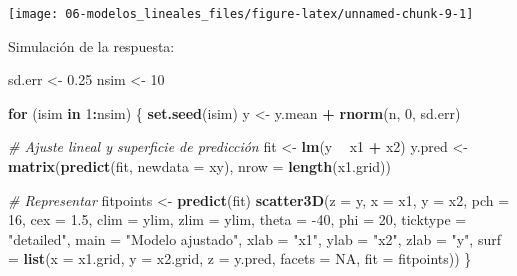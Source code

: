 \documentclass[
  spanish,
]{book}
\newenvironment{Shaded}{\begin{snugshade}}{\end{snugshade}}
\newcommand{\CommentTok}[1]{\textcolor[rgb]{0.56,0.35,0.01}{\textit{#1}}}
\newcommand{\ControlFlowTok}[1]{\textcolor[rgb]{0.13,0.29,0.53}{\textbf{#1}}}
\newcommand{\DataTypeTok}[1]{\textcolor[rgb]{0.13,0.29,0.53}{#1}}
\newcommand{\DecValTok}[1]{\textcolor[rgb]{0.00,0.00,0.81}{#1}}
\newcommand{\FloatTok}[1]{\textcolor[rgb]{0.00,0.00,0.81}{#1}}
\newcommand{\KeywordTok}[1]{\textcolor[rgb]{0.13,0.29,0.53}{\textbf{#1}}}
\newcommand{\NormalTok}[1]{#1}
\newcommand{\OperatorTok}[1]{\textcolor[rgb]{0.81,0.36,0.00}{\textbf{#1}}}
\newcommand{\OtherTok}[1]{\textcolor[rgb]{0.56,0.35,0.01}{#1}}
\newcommand{\StringTok}[1]{\textcolor[rgb]{0.31,0.60,0.02}{#1}}
\theoremstyle{break}
\theoremstyle{definition}
\theoremstyle{definition}
\theoremstyle{definition}
\theoremstyle{remark}
\begin{document}
\begin{center}\texttt{[image: 06-modelos\_lineales\_files/figure-latex/unnamed-chunk-9-1]} \end{center}

Simulación de la respuesta:

\begin{Shaded}
\begin{Highlighting}[]
\NormalTok{sd.err <-}\StringTok{ }\FloatTok{0.25}
\NormalTok{nsim <-}\StringTok{ }\DecValTok{10}

\ControlFlowTok{for}\NormalTok{ (isim }\ControlFlowTok{in} \DecValTok{1}\OperatorTok{:}\NormalTok{nsim) \{}
  \KeywordTok{set.seed}\NormalTok{(isim)}
\NormalTok{  y <-}\StringTok{ }\NormalTok{y.mean }\OperatorTok{+}\StringTok{ }\KeywordTok{rnorm}\NormalTok{(n, }\DecValTok{0}\NormalTok{, sd.err)}
  
  \CommentTok{# Ajuste lineal y superficie de predicción}
\NormalTok{  fit <-}\StringTok{ }\KeywordTok{lm}\NormalTok{(y }\OperatorTok{~}\StringTok{ }\NormalTok{x1 }\OperatorTok{+}\StringTok{ }\NormalTok{x2)}
\NormalTok{  y.pred <-}\StringTok{ }\KeywordTok{matrix}\NormalTok{(}\KeywordTok{predict}\NormalTok{(fit, }\DataTypeTok{newdata =}\NormalTok{ xy), }\DataTypeTok{nrow =} \KeywordTok{length}\NormalTok{(x1.grid)) }
  
  \CommentTok{# Representar}
\NormalTok{  fitpoints <-}\StringTok{ }\KeywordTok{predict}\NormalTok{(fit) }
  \KeywordTok{scatter3D}\NormalTok{(}\DataTypeTok{z =}\NormalTok{ y, }\DataTypeTok{x =}\NormalTok{ x1, }\DataTypeTok{y =}\NormalTok{ x2, }\DataTypeTok{pch =} \DecValTok{16}\NormalTok{, }\DataTypeTok{cex =} \FloatTok{1.5}\NormalTok{, }\DataTypeTok{clim =}\NormalTok{ ylim, }\DataTypeTok{zlim =}\NormalTok{ ylim,}
            \DataTypeTok{theta =} \DecValTok{-40}\NormalTok{, }\DataTypeTok{phi =} \DecValTok{20}\NormalTok{, }\DataTypeTok{ticktype =} \StringTok{"detailed"}\NormalTok{, }
            \DataTypeTok{main =} \StringTok{"Modelo ajustado"}\NormalTok{, }\DataTypeTok{xlab =} \StringTok{"x1"}\NormalTok{, }\DataTypeTok{ylab =} \StringTok{"x2"}\NormalTok{, }\DataTypeTok{zlab =} \StringTok{"y"}\NormalTok{, }
            \DataTypeTok{surf =} \KeywordTok{list}\NormalTok{(}\DataTypeTok{x =}\NormalTok{ x1.grid, }\DataTypeTok{y =}\NormalTok{ x2.grid, }\DataTypeTok{z =}\NormalTok{ y.pred, }
                        \DataTypeTok{facets =} \OtherTok{NA}\NormalTok{, }\DataTypeTok{fit =}\NormalTok{ fitpoints))}
\NormalTok{\}}
\end{Highlighting}
\end{Shaded}
\end{document}

